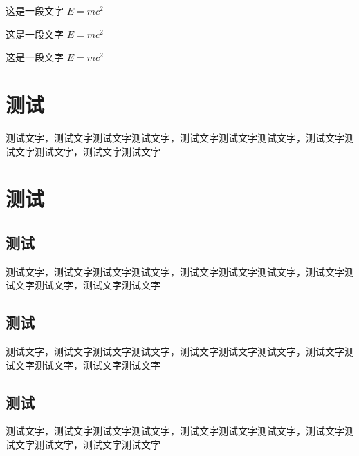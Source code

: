 \begin{question}
  这是一段文字 $E = m c^2$
\end{question}

\begin{claim}
  这是一段文字 $E = m c^2$
\end{claim}

\begin{remark}
  这是一段文字 $E = m c^2$
\end{remark}


\section{测试}

测试文字，测试文字测试文字测试文字，测试文字测试文字测试文字，测试文字测试文字测试文字，测试文字测试文字



\section{测试}


\subsection{测试}

测试文字，测试文字测试文字测试文字，测试文字测试文字测试文字，测试文字测试文字测试文字，测试文字测试文字


\subsection{测试}

测试文字，测试文字测试文字测试文字，测试文字测试文字测试文字，测试文字测试文字测试文字，测试文字测试文字


\subsection{测试}

测试文字，测试文字测试文字测试文字，测试文字测试文字测试文字，测试文字测试文字测试文字，测试文字测试文字

